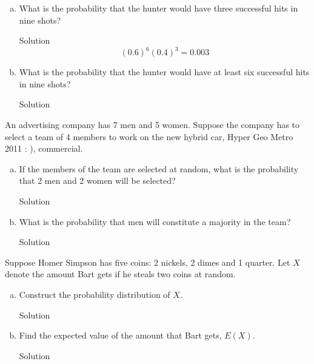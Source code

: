\documentclass{article}
\begin{document}
\begin{spacing}{1.1}
\begin{homeworkProblem}
\begin{enumerate}[(a)]
\begin{homeworkSection}{Solution}
				\[{(0.6)^8}(0.4) = 0.006\]
			\end{homeworkSection}
		\item What is the probability that the hunter would have three successful hits in nine shots?
			\begin{homeworkSection}{Solution}
				\[{(0.6)^6}{(0.4)^3} = 0.003\]
			\end{homeworkSection}
		\item What is the probability that the hunter would have at least six successful hits in nine shots?
			\begin{homeworkSection}{Solution}
				
			\end{homeworkSection}
	\end{enumerate}
\end{homeworkProblem}
\begin{homeworkProblem}
	An advertising company has 7 men and 5 women.  Suppose the company has to select a team of 4 members to work on the new hybrid car, Hyper Geo Metro 2011 : ), commercial.  
	\begin{enumerate}[(a)]
		\item If the members of the team are selected at random, what is the probability that 2 men and 2 women will be selected?
			\begin{homeworkSection}{Solution}
		
			\end{homeworkSection}
		\item What is the probability that men will constitute a majority in the team?
			\begin{homeworkSection}{Solution}
		
			\end{homeworkSection}			
	\end{enumerate}
\end{homeworkProblem}
\begin{homeworkProblem}
	Suppose Homer Simpson has five coins: 2 nickels, 2 dimes and 1 quarter.  Let $X$ denote the amount Bart gets if he steals two coins at random.  
	\begin{enumerate}[(a)]
		\item  Construct the probability distribution of $X$.
			\begin{homeworkSection}{Solution}
		
			\end{homeworkSection}
		\item  Find the expected value of the amount that Bart gets, $E(X)$.
			\begin{homeworkSection}{Solution}
		

\end{homeworkSection}
\end{enumerate}
\end{homeworkProblem}
\end{spacing}
\end{document}
